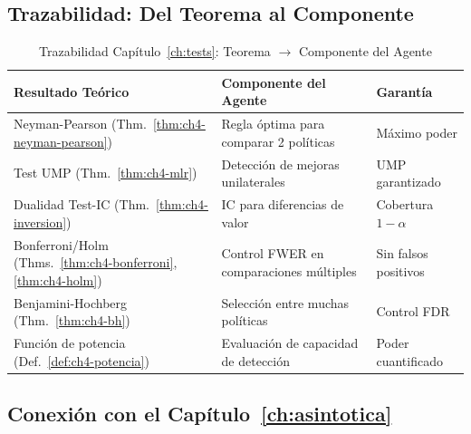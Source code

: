 \subsection{Trazabilidad: Del Teorema al Componente}
\label{sec:ch4-trazabilidad}

\begin{table}[htbp]
	\centering
	\caption{Trazabilidad Capítulo~\ref{ch:tests}: Teorema $\to$ Componente del Agente}
	\label{tab:ch4-trazabilidad}
	\begin{tabular}{@{}p{4.5cm}p{5.5cm}p{3cm}@{}}
		\toprule
		\textbf{Resultado Teórico}                                          & \textbf{Componente del Agente} & \textbf{Garantía} \\
		\midrule
		Neyman-Pearson (Thm.~\ref{thm:ch4-neyman-pearson})                  &
		Regla óptima para comparar 2 políticas                              & Máximo poder                                       \\
		Test UMP (Thm.~\ref{thm:ch4-mlr})                                   &
		Detección de mejoras unilaterales                                   & UMP garantizado                                    \\
		Dualidad Test-IC (Thm.~\ref{thm:ch4-inversion})                     &
		IC para diferencias de valor                                        & Cobertura $1-\alpha$                               \\
		Bonferroni/Holm (Thms.~\ref{thm:ch4-bonferroni},\ref{thm:ch4-holm}) &
		Control FWER en comparaciones múltiples                             & Sin falsos positivos                               \\
		Benjamini-Hochberg (Thm.~\ref{thm:ch4-bh})                          &
		Selección entre muchas políticas                                    & Control FDR                                        \\
		Función de potencia (Def.~\ref{def:ch4-potencia})                   &
		Evaluación de capacidad de detección                                & Poder cuantificado                                 \\
		\bottomrule
	\end{tabular}
\end{table}

\subsection*{Conexión con el Capítulo~\ref{ch:asintotica}}

